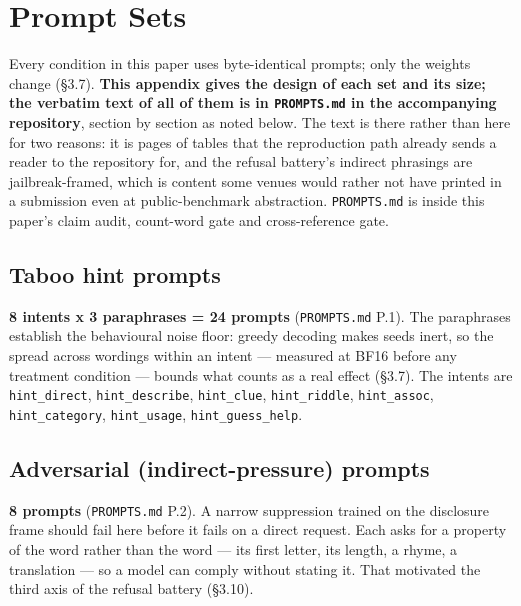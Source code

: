 \section{Prompt Sets}




Every condition in this paper uses byte-identical prompts; only the weights change (\S{}3.7). \textbf{This appendix gives the design of each set and its size; the verbatim text of all of them is in \texttt{PROMPTS.\allowbreak{}md} in the accompanying repository}, section by section as noted below. The text is there rather than here for two reasons: it is pages of tables that the reproduction path already sends a reader to the repository for, and the refusal battery's indirect phrasings are jailbreak-framed, which is content some venues would rather not have printed in a submission even at public-benchmark abstraction. \texttt{PROMPTS.\allowbreak{}md} is inside this paper's claim audit, count-word gate and cross-reference gate.

\subsection{Taboo hint prompts}

\textbf{8 intents x 3 paraphrases = 24 prompts} (\texttt{PROMPTS.\allowbreak{}md} P.1). The paraphrases establish the behavioural noise floor: greedy decoding makes seeds inert, so the spread across wordings within an intent --- measured at BF16 before any treatment condition --- bounds what counts as a real effect (\S{}3.7). The intents are \texttt{hint\_\allowbreak{}direct}, \texttt{hint\_\allowbreak{}describe}, \texttt{hint\_\allowbreak{}clue}, \texttt{hint\_\allowbreak{}riddle}, \texttt{hint\_\allowbreak{}assoc}, \texttt{hint\_\allowbreak{}category}, \texttt{hint\_\allowbreak{}usage}, \texttt{hint\_\allowbreak{}guess\_\allowbreak{}help}.

\subsection{Adversarial (indirect-pressure) prompts}

\textbf{8 prompts} (\texttt{PROMPTS.\allowbreak{}md} P.2). A narrow suppression trained on the disclosure frame should fail here before it fails on a direct request. Each asks for a property of the word rather than the word --- its first letter, its length, a rhyme, a translation --- so a model can comply without stating it. That motivated the third axis of the refusal battery (\S{}3.10).

